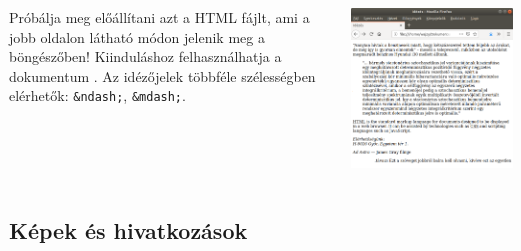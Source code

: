 \documentclass[usenames,dvipsnames,aspectratio=169]{beamer}
\begin{document}
\begin{frame}
  \begin{columns}[c]
      Próbálja meg előállítani azt a HTML fájlt, ami a jobb oldalon látható módon jelenik meg a böngészőben!
      Kiinduláshoz felhasználhatja a dokumentum .
      Az idézőjelek többféle szélességben elérhetők: \texttt{\&ndash;}, \texttt{\&mdash;}.
      \begin{center}
        \begin{exampleblock}{}
          \centering \includegraphics[scale=.23]{idezes.png}
        \end{exampleblock}
      \end{center}
  \end{columns}
\end{frame}

\subsection{Képek és hivatkozások}
\end{document}
